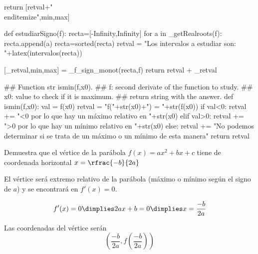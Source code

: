 \documentclass[palatino,nosec]{Docencia}
\begin{document}
\begin{sagesilent}
 return [retval+"\\end{itemize}",min,max]

def estudiarSigno(f):
 recta=[-Infinity,Infinity]
 for a in _getRealroots(f):
  recta.append(a)
 recta=sorted(recta) 
 retval = "Los intervalos a estudiar son: "+latex(intervalos(recta))
 
 [_retval,min,max] = _f_sign_monot(recta,f)
 return retval + _retval


## Function str ismin(f,x0).
## f: second derivate of the function to study.
## x0: value to check if it is maximum.
## return 	string with the answer.
def ismin(f,x0):
 val = f(x0)
 retval = "f("+str(x0)+") = "+str(f(x0))
 if val<0:
  retval += "<0 por lo que hay un máximo relativo en "+str(x0)
 elif val>0:
  retval += ">0 por lo que hay un mínimo relativo en "+str(x0)
 else:
  retval += "No podemos determinar si se trata de un máximo o un mínimo de esta manera" 
 return retval
 
\end{sagesilent}

\begin{problem} Demuestra que el vértice de la parábola $f(x) = ax^2+bx+c$ tiene de coordenada horizontal $x=\rfrac{-b}{2a}$
\solution

El vértice será extremo relativo de la parábola (máximo o mínimo según el signo de $a$) y se encontrará en $f'(x) = 0$.

\[f'(x) = 0 \dimplies 2ax+b=0 \dimplies x=\frac{-b}{2a}\]

Las coordenadas del vértice serán \[\left(\frac{-b}{2a},f\left(\frac{-b}{2a}\right) \right)\]


\end{problem}
\end{document}
